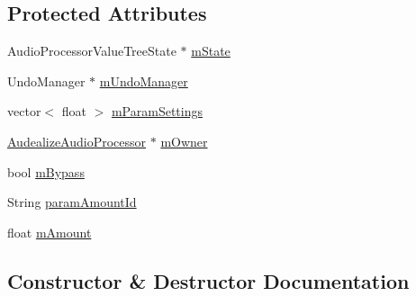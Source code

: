 \subsection*{Protected Attributes}
\begin{DoxyCompactItemize}
\item 
Audio\+Processor\+Value\+Tree\+State $\ast$ \hyperlink{class_audealize_1_1_audealize_audio_processor_a91e3f2ebc485c04a2ae0c651c9dd4a1e}{m\+State}
\item 
Undo\+Manager $\ast$ \hyperlink{class_audealize_1_1_audealize_audio_processor_aad11b053db8e6f9ae61afa610126b23d}{m\+Undo\+Manager}
\item 
vector$<$ float $>$ \hyperlink{class_audealize_1_1_audealize_audio_processor_a799580d9637076562aafa74de6e166b8}{m\+Param\+Settings}
\item 
\hyperlink{class_audealize_1_1_audealize_audio_processor}{Audealize\+Audio\+Processor} $\ast$ \hyperlink{class_audealize_1_1_audealize_audio_processor_acd64a89d7e6550c2db7ec1d2a0c8281e}{m\+Owner}
\item 
bool \hyperlink{class_audealize_1_1_audealize_audio_processor_a8f8e6d2d636f070c9dcce80725bb67f3}{m\+Bypass}
\item 
String \hyperlink{class_audealize_1_1_audealize_audio_processor_a8c51332f043fbb80c2fa573a7f753c8a}{param\+Amount\+Id}
\item 
float \hyperlink{class_audealize_1_1_audealize_audio_processor_af232a68cdeacc57765eed0122da6ce27}{m\+Amount}
\end{DoxyCompactItemize}


\subsection{Constructor \& Destructor Documentation}
